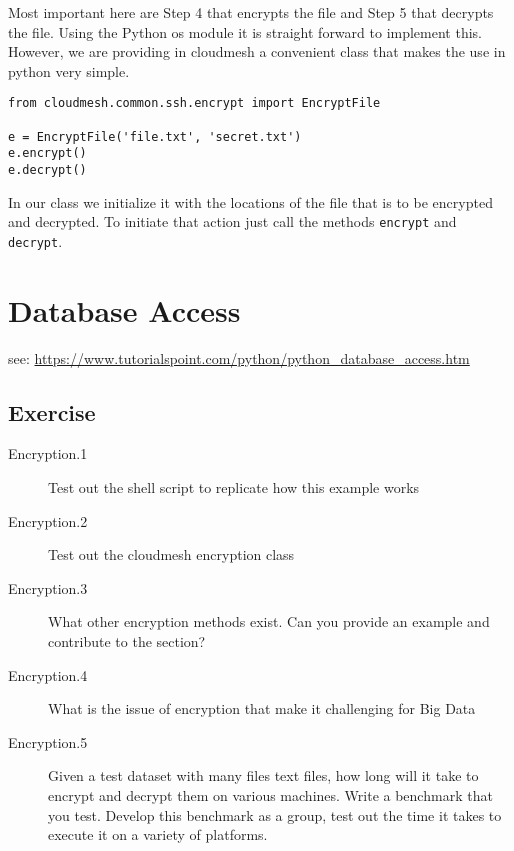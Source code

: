 Most important here are Step 4 that encrypts the file and Step 5 that
decrypts the file. Using the Python os module it is straight forward
to implement this. However, we are providing in cloudmesh a convenient
class that makes the use in python very simple.

\begin{verbatim}
from cloudmesh.common.ssh.encrypt import EncryptFile

e = EncryptFile('file.txt', 'secret.txt')
e.encrypt()
e.decrypt()
\end{verbatim}

In our class we initialize it with the locations of the file that is
to be encrypted and decrypted. To initiate that action just call the
methods \verb|encrypt| and \verb|decrypt|.

\section{Database Access}\label{database-access}


see: \url{https://www.tutorialspoint.com/python/python_database_access.htm}


\subsection{Exercise}

\begin{description}

\item[Encryption.1] Test out the shell script to replicate how this
  example works

\item[Encryption.2] Test out the cloudmesh encryption class

\item[Encryption.3] What other encryption methods exist. Can you
  provide an example and contribute to the section?

\item[Encryption.4] What is the issue of encryption that make it
  challenging for Big Data
 
\item[Encryption.5] Given a test dataset with many files text files,
  how long will it take to encrypt and decrypt them on various
  machines. Write a benchmark that you test. Develop this benchmark as
  a group, test out the time it takes to execute it on a variety of
  platforms.


\end{description}